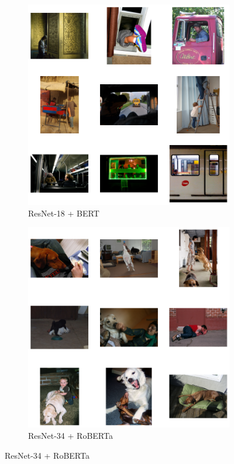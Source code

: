 \documentclass[11pt]{article}
\begin{document}
\begin{figure}[H]
\begin{subfigure}[b]{0.3\textwidth}
        \includegraphics[width=\linewidth]{Q2/A cat sitting with a human/2.png}
        \caption{\tiny ResNet-18 + BERT}
    \end{subfigure}
    \hfill
    \begin{subfigure}[b]{0.3\textwidth}
        \includegraphics[width=\linewidth]{Q2/A cat sitting with a human/3.png}
        \caption{\tiny ResNet-34 + RoBERTa}
    \end{subfigure}
    
\end{figure}
\end{document}

